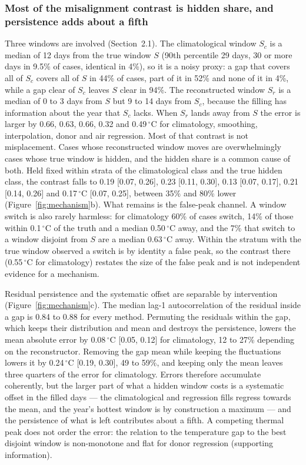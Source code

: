 \documentclass[draft]{agujournal2025}
\begin{document}
\subsubsection{Most of the misalignment contrast is hidden share, and persistence adds about a fifth}

Three windows are involved (Section~2.1). The climatological window $S_c$ is a
median of 12 days from the true window $S$ (90th percentile 29 days, 30 or more
days in 9.5\% of cases, identical in 4\%), so it is a noisy proxy: a gap that
covers all of $S_c$ covers all of $S$ in 44\% of cases, part of it in 52\% and
none of it in 4\%, while a gap clear of $S_c$ leaves $S$ clear in 94\%. The
reconstructed window $S_r$ is a median of 0 to 3 days from $S$ but 9 to 14 days
from $S_c$, because the filling has information about the year that $S_c$ lacks.
When $S_r$ lands away from $S$ the error is larger by 0.66, 0.63, 0.66, 0.32 and
0.49\,$^{\circ}$C for climatology, smoothing, interpolation, donor and air
regression. Most of that contrast is not misplacement. Cases whose reconstructed
window moves are overwhelmingly cases whose true window is hidden, and the hidden
share is a common cause of both. Held fixed within strata of the climatological
class and the true hidden class, the contrast falls to 0.19 [0.07, 0.26], 0.23
[0.11, 0.30], 0.13 [0.07, 0.17], 0.21 [0.14, 0.26] and 0.17\,$^{\circ}$C
[0.07, 0.25], between 35\% and 80\% lower (Figure~\ref{fig:mechanism}b). What
remains is the false-peak channel. A window switch is also rarely harmless: for
climatology 60\% of cases switch, 14\% of those within 0.1\,$^{\circ}$C of the
truth and a median 0.50\,$^{\circ}$C away, and the 7\% that switch to a window
disjoint from $S$ are a median 0.63\,$^{\circ}$C away. Within the stratum with the
true window observed a switch is by identity a false peak, so the contrast there
(0.55\,$^{\circ}$C for climatology) restates the size of the false peak and is not
independent evidence for a mechanism.

Residual persistence and the systematic offset are separable by intervention
(Figure~\ref{fig:mechanism}c). The median lag-1 autocorrelation of the residual
inside a gap is 0.84 to 0.88 for every method. Permuting the residuals within the
gap, which keeps their distribution and mean and destroys the persistence,
lowers the mean absolute error by 0.08\,$^{\circ}$C [0.05, 0.12] for climatology,
12 to 27\% depending on the reconstructor. Removing the gap mean while keeping the
fluctuations lowers it by 0.24\,$^{\circ}$C [0.19, 0.30], 49 to 59\%, and keeping
only the mean leaves three quarters of the error for climatology. Errors therefore
accumulate coherently, but the larger part of what a hidden window costs is a
systematic offset in the filled days --- the climatological and regression fills
regress towards the mean, and the year's hottest window is by construction a
maximum --- and the persistence of what is left contributes about a fifth. A
competing thermal peak does not order the error: the relation to the temperature
gap to the best disjoint window is non-monotone and flat for donor regression
(supporting information).
\end{document}

